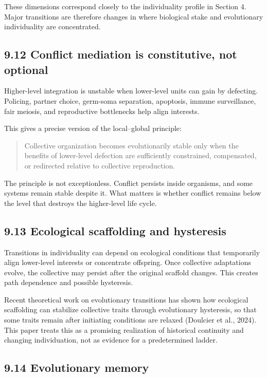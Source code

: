 \documentclass[
  11pt,
]{article}
\begin{document}
These dimensions correspond closely to the individuality profile in
Section 4. Major transitions are therefore changes in where biological
stake and evolutionary individuality are concentrated.

\subsection{9.12 Conflict mediation is constitutive, not
optional}\label{conflict-mediation-is-constitutive-not-optional}

Higher-level integration is unstable when lower-level units can gain by
defecting. Policing, partner choice, germ-soma separation, apoptosis,
immune surveillance, fair meiosis, and reproductive bottlenecks help
align interests.

This gives a precise version of the local--global principle:

\begin{quote}
Collective organization becomes evolutionarily stable only when the
benefits of lower-level defection are sufficiently constrained,
compensated, or redirected relative to collective reproduction.
\end{quote}

The principle is not exceptionless. Conflict persists inside organisms,
and some systems remain stable despite it. What matters is whether
conflict remains below the level that destroys the higher-level life
cycle.

\subsection{9.13 Ecological scaffolding and
hysteresis}\label{ecological-scaffolding-and-hysteresis}

Transitions in individuality can depend on ecological conditions that
temporarily align lower-level interests or concentrate offspring. Once
collective adaptations evolve, the collective may persist after the
original scaffold changes. This creates path dependence and possible
hysteresis.

Recent theoretical work on evolutionary transitions has shown how
ecological scaffolding can stabilize collective traits through
evolutionary hysteresis, so that some traits remain after initiating
conditions are relaxed (Doulcier et al., 2024). This paper treats this
as a promising realization of historical continuity and changing
individuation, not as evidence for a predetermined ladder.

\subsection{9.14 Evolutionary memory}\label{evolutionary-memory}
\end{document}
